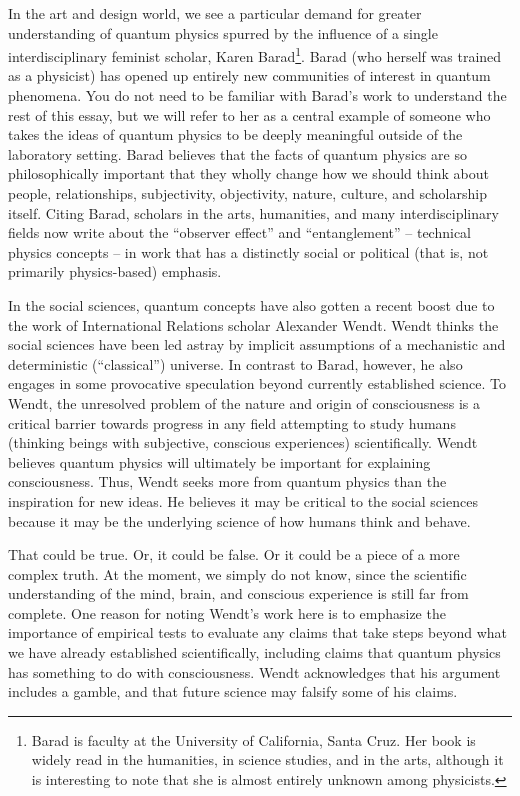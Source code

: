 \documentclass[onecolumn,preprintnumbers,amsmath,amssymbn,reprint,nofootinbib,superscriptaddress]{revtex4}    %
\begin{document}
In the art and design world, we see a particular demand for greater understanding of quantum physics spurred by the influence of a single interdisciplinary feminist scholar, Karen Barad\cite{Barad}\footnote{Barad is faculty at the University of California, Santa Cruz.  Her book \cite{Barad} is widely read in the humanities, in science studies, and in the arts, although it is interesting to note that she is almost entirely unknown among physicists.}.  Barad (who herself was trained as a physicist) has opened up entirely new communities of interest in quantum phenomena.  You do not need to be familiar with Barad's work to understand the rest of this essay, but we will refer to her as a central example of someone who takes the ideas of quantum physics to be deeply meaningful outside of the laboratory setting.  Barad believes that the facts of quantum physics are so philosophically important that they wholly change how we should think about people, relationships, subjectivity, objectivity, nature, culture, and scholarship itself. Citing Barad, scholars in the arts, humanities, and many interdisciplinary fields now write about the ``observer effect'' and ``entanglement'' -- technical physics concepts -- in work that has a distinctly social or political (that is, not primarily physics-based) emphasis.  

In the social sciences, quantum concepts have also gotten a recent boost due to the work of International Relations scholar Alexander Wendt\cite{Wendt}. Wendt thinks the social sciences have been led astray by implicit assumptions of a mechanistic and deterministic (``classical'') universe.  In contrast to Barad, however, he also engages in some provocative speculation beyond currently established science. To Wendt, the unresolved problem of the nature and origin of consciousness is a critical barrier towards progress in any field attempting to study humans (thinking beings with subjective, conscious experiences) scientifically.  Wendt believes quantum physics will ultimately be important for explaining consciousness.  Thus, Wendt seeks more from quantum physics than the inspiration for new ideas.  He believes it may be critical to the social sciences because it may be the underlying science of how humans think and behave.  

That could be true.  Or, it could be false.  Or it could be a piece of a more complex truth.  At the moment, we simply do not know, since the scientific understanding of the mind, brain, and conscious experience is still far from complete.  One reason for noting Wendt's work here is to emphasize the importance of empirical tests to evaluate any claims that take steps beyond what we have already established scientifically, including claims that quantum physics has something to do with consciousness. Wendt acknowledges that his argument includes a gamble, and that future science may falsify some of his claims.  
\end{document}
